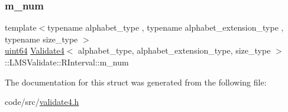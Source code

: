 \subsubsection{\texorpdfstring{m\+\_\+num}{m\_num}}
{\footnotesize\ttfamily template$<$typename alphabet\+\_\+type , typename alphabet\+\_\+extension\+\_\+type , typename size\+\_\+type $>$ \\
\hyperlink{types_8h_a60e8696a4678cd348e991a1f172e53f7}{uint64} \hyperlink{class_validate4}{Validate4}$<$ alphabet\+\_\+type, alphabet\+\_\+extension\+\_\+type, size\+\_\+type $>$\+::L\+M\+S\+Validate\+::\+R\+Interval\+::m\+\_\+num}



The documentation for this struct was generated from the following file\+:\begin{DoxyCompactItemize}
\item 
code/src/\hyperlink{validate4_8h}{validate4.\+h}\end{DoxyCompactItemize}
